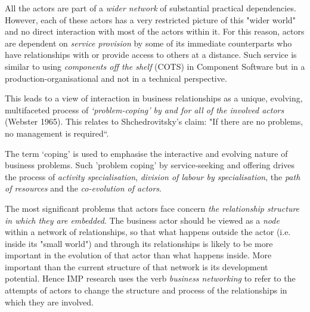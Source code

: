 \documentclass[11pt,a4paper]{article}
\begin{document}
All the actors are part of a \emph{wider network} of substantial practical
dependencies.  However, each of these actors has a very restricted picture of
this "wider world" and no direct interaction with most of the actors within
it.  For this reason, actors are dependent on \emph{service provision} by some
of its immediate counterparts who have relationships with or provide access to
others at a distance. Such service is similar to using \emph{components off
  the shelf} (COTS) in Component Software but in a production-organisational
and not in a technical perspective.

This leads to a view of interaction in business relationships as a unique,
evolving, multifaceted process of \emph{‘problem-coping’ by and for all of the
  involved actors} (Webster 1965). This relates to Shchedrovitsky's claim:
"If there are no problems, no management is required“.

The term ‘coping’ is used to emphasise the interactive and evolving nature of
business problems.  Such 'problem coping' by service-seeking and offering
drives the process of \emph{activity specialisation}, \emph{division of labour
  by specialisation}, the \emph{path of resources} and the \emph{co-evolution
  of actors}.

The most signiﬁcant problems that actors face concern \emph{the relationship
  structure in which they are embedded}. The business actor should be viewed
as a \emph{node} within a network of relationships, so that what happens
outside the actor (i.e. inside its "small world") and through its
relationships is likely to be more important in the evolution of that actor
than what happens inside.  More important than the current structure of that
network is its development potential.  Hence IMP research uses the verb
\emph{business networking} to refer to the attempts of actors to change the
structure and process of the relationships in which they are involved.
\end{document}
